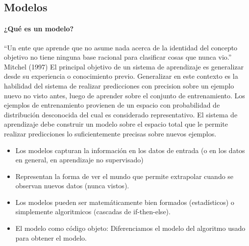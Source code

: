\documentclass[a4paper,11pt,spanish]{book}
\begin{document}
    \subsection{Modelos}

      \paragraph{¿Qué es un modelo?}
      “Un ente que aprende que no asume nada acerca de la identidad del concepto objetivo no tiene ninguna base racional para clasificar cosas que nunca vio.”
      Mitchel (1997)
      El principal objetivo de un sistema de aprendizaje es generalizar desde su experiencia o conocimiento previo. Generalizar en este contexto es la habilidad del sistema de realizar
      predicciones con precision sobre un ejemplo nuevo no visto antes, luego de aprender sobre el conjunto de entrenamiento. Los ejemplos de entrenamiento provienen de un espacio 
      con probabilidad de distribución desconocida del cual es considerado representativo. El sistema de aprendizaje debe construir un modelo sobre el espacio total que le permite realizar
      predicciones lo suficientemente precisas sobre nuevos ejemplos.
      \begin{itemize}
	\item Los modelos capturan la información en los datos de entrada (o en los datos en general, en aprendizaje no supervisado)
	\item Representan la forma de ver el mundo que permite extrapolar cuando se observan nuevos datos (nunca vistos).
	\item Los modelos pueden ser matemáticamente bien formados (estadísticos) o simplemente algoritmicos (cascadas de if-then-else).
	\item El modelo como código objeto: Diferenciamos el modelo del algoritmo usado para obtener el modelo.
      \end{itemize}
\end{document}

